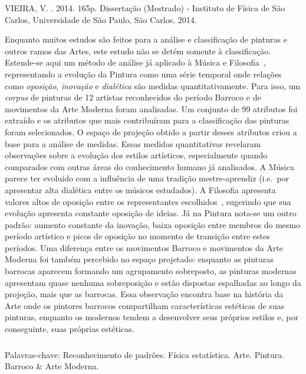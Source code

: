 \begin{resumo2}
\vspace{-10mm}
VIEIRA, V. \textbf{\ABNTtitulodata}. 2014. 165p. Dissertação (Mestrado) - Instituto de Física de São Carlos, Universidade de São Paulo, São Carlos, 2014.
\vspace{15mm}

Enquanto muitos estudos são feitos para a análise e classificação de
pinturas e outros ramos das Artes, este estudo não se detém somente à
classificação. Estende-se aqui um método de análise já aplicado à
Música e Filosofia~\cite{vieira}, representando a evolução da Pintura
como uma série temporal onde relações como \textit{oposição},
\textit{inovação} e \textit{dialética} são medidas
quantitativamente. Para isso, um \textit{corpus} de pinturas de 12
artistas reconhecidos do período Barroco e de movimentos da Arte
Moderna foram analisadas. Um conjunto de 99 atributos foi extraído e
os atributos que mais contribuíram para a classificação das pinturas
foram selecionados. O espaço de projeção obtido a partir desses
atributos criou a base para a análise de medidas. Essas medidas
quantitativas revelaram observações sobre a evolução dos estilos
artísticos, especialmente quando comparados com outras áreas do
conhecimento humano já analisados. A Música parece ter evoluído com a
influência de uma tradição mestre-aprendiz (i.e.\ por apresentar alta
dialética entre os músicos estudados). A Filosofia apresenta valores
altos de oposição entre os representantes escolhidos~\cite{vieira},
sugerindo que sua evolução apresenta constante oposição de ideias. Já
na Pintura nota-se um outro padrão: aumento constante da inovação,
baixa oposição entre membros do mesmo período artístico e picos de
oposição no momento de transição entre estes períodos. Uma diferença
entre os movimentos Barroco e movimentos da Arte Moderna foi também
percebido no espaço projetado: enquanto as pinturas barrocas aparecem
formando um agrupamento sobreposto, as pinturas modernas apresentam
quase nenhuma sobreposição e estão dispostas espalhadas ao longo da
projeção, mais que as barrocas. Essa observação encontra base na
história da Arte onde os pintores barrocos compartilham
características estéticas de suas pinturas, enquanto os modernos
tendem a desenvolver seus próprios estilos e, por conseguinte, suas
próprias estéticas.

$\phantom{linha em branco}$\\ Palavras-chave: Reconhecimento de
padrões. Física estatística. Arte. Pintura. Barroco \& Arte
Moderna. 

\end{resumo2}


